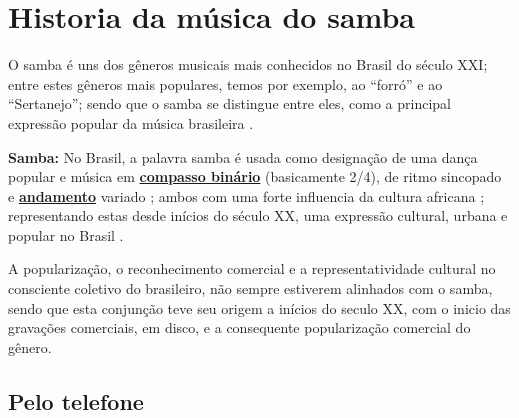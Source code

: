 
\chapter{Historia da música do samba}

O samba é uns dos gêneros musicais mais conhecidos no Brasil do século XXI;
entre estes gêneros mais populares, temos por exemplo, ao ``forró'' e ao ``Sertanejo'';
sendo que o samba se distingue entre eles, 
como a principal expressão popular da música brasileira \cite[pp. 47]{diniz2008almanaque}.\\


\begin{tcbinformation}
\textbf{Samba:}
\label{ref:samba} 
No Brasil, a palavra samba  é usada como designação de uma dança popular  
e música  em \hyperref[subsec:compassobinario]{\textbf{compasso binário}} (basicamente 2/4), 
de ritmo sincopado e \hyperref[sec:Andamento]{\textbf{andamento}} 
variado \cite[pp. 290]{dourado2004dicionario} \cite[pp. 684]{marcondes1977enciclopediav2};
ambos com uma forte influencia da cultura africana \cite[pp. 290]{dourado2004dicionario};
representando estas desde inícios do século XX, 
uma expressão cultural, urbana e popular no Brasil \cite[pp. 684]{marcondes1977enciclopediav2} \cite[pp. 290]{dourado2004dicionario}.
\end{tcbinformation}

A popularização, o reconhecimento comercial e a representatividade cultural no consciente coletivo do brasileiro,
não sempre estiverem alinhados com o samba, 
sendo que esta conjunção teve seu origem a inícios do seculo XX, 
com o inicio das gravações comerciais, em disco, e a consequente popularização comercial do gênero.

\section{Pelo telefone}


